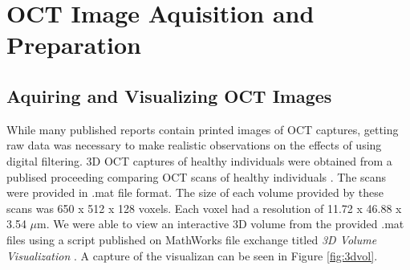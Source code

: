 \documentclass{article}
\begin{document}
	\section{\label{sec:level1} OCT Image Aquisition and Preparation}

	\subsection{\label{sec:level2} Aquiring and Visualizing OCT Images}
		While many published reports contain printed images of OCT captures, getting raw data was necessary to make realistic observations on the effects of using digital filtering. 3D OCT captures of healthy individuals were obtained from a publised proceeding comparing OCT scans of healthy individuals \cite{tahereh_2014}. The scans were provided in .mat file format. The size of each volume provided by these scans was 650 x 512 x 128 voxels. Each voxel had a resolution of 11.72 x 46.88 x 3.54 $\mu$m. We were able to view an interactive 3D volume from the provided .mat files using a script published on MathWorks file exchange titled \textit{3D Volume Visualization} \cite{stough}. A capture of the visualizan can be seen in Figure \ref{fig:3dvol}.
\end{document}
